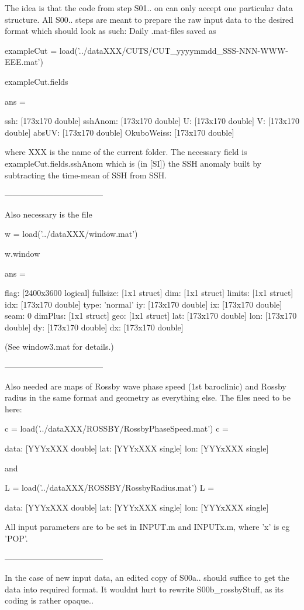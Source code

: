 The idea is that the code from step S01.. on can only
accept one particular data structure.
All S00.. steps are meant to prepare the raw input data to the desired format which should look as such:
Daily .mat-files saved as

exampleCut = load('../dataXXX/CUTS/CUT_yyyymmdd_SSS-NNN-WWW-EEE.mat')

exampleCut.fields

ans =

           ssh: [173x170 double]
       sshAnom: [173x170 double]
             U: [173x170 double]
             V: [173x170 double]
         absUV: [173x170 double]
    OkuboWeiss: [173x170 double]


where XXX is the name of the current folder.
The necessary field is exampleCut.fields.sshAnom which is (in [SI]) the SSH anomaly built by subtracting the time-mean of SSH from SSH.

------------------------------------

Also necessary is the file

w = load('../dataXXX/window.mat')

w.window

ans =

        flag: [2400x3600 logical]
    fullsize: [1x1 struct]
         dim: [1x1 struct]
      limits: [1x1 struct]
         idx: [173x170 double]
        type: 'normal'
          iy: [173x170 double]
          ix: [173x170 double]
        seam: 0
     dimPlus: [1x1 struct]
         geo: [1x1 struct]
         lat: [173x170 double]
         lon: [173x170 double]
          dy: [173x170 double]
          dx: [173x170 double]


(See window3.mat for details.)

------------------------------------

Also needed are maps of Rossby wave phase speed (1st baroclinic) and Rossby radius in the same format and geometry as everything else.
The files need to be here:

c = load('../dataXXX/ROSSBY/RossbyPhaseSpeed.mat')
c =

    data: [YYYxXXX double]
     lat: [YYYxXXX single]
     lon: [YYYxXXX single]

and

L = load('../dataXXX/ROSSBY/RossbyRadius.mat')
L =

    data: [YYYxXXX double]
     lat: [YYYxXXX single]
     lon: [YYYxXXX single]


All input parameters are to be set in INPUT.m and INPUTx.m, where 'x' is eg 'POP'.

------------------------------------

In the case of new input data, an edited copy of S00a.. should suffice to get the data into required format.
It wouldnt hurt to rewrite S00b_rossbyStuff, as its coding is rather opaque..
